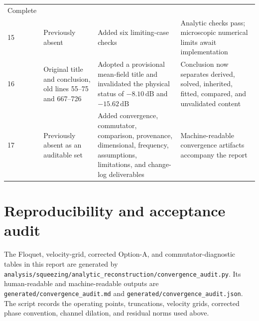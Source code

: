 \documentclass[11pt,a4paper]{article}
\newcommand{\dB}{\,\mathrm{dB}}
\begin{document}
\begin{longtable}{C{0.65cm}L{4.2cm}L{5.2cm}L{4.3cm}}
Complete\\
15 & Previously absent &
Added six limiting-case checks &
Analytic checks pass; microscopic numerical limits await implementation\\
16 & Original title and conclusion, old lines 55--75 and 667--726 &
Adopted a provisional mean-field title and invalidated the physical status
of $-8.10\dB$ and $-15.62\dB$ &
Conclusion now separates derived, solved, inherited, fitted, compared, and
unvalidated content\\
17 & Previously absent as an auditable set &
Added convergence, commutator, comparison, provenance, dimensional,
frequency, assumptions, limitations, and change-log deliverables &
Machine-readable convergence artifacts accompany the report\\
\bottomrule
\end{longtable}

\section{Reproducibility and acceptance audit}
\label{app:reproducibility}

The Floquet, velocity-grid, corrected Option-A, and commutator-diagnostic
tables in this report are generated by
\texttt{analysis/squeezing/analytic\_reconstruction/convergence\_audit.py}.
Its human-readable and machine-readable outputs are
\texttt{generated/convergence\_audit.md} and
\texttt{generated/convergence\_audit.json}. The script records the operating
points, truncations, velocity grids, corrected phase convention, channel
dilation, and residual norms used above.
\end{document}
